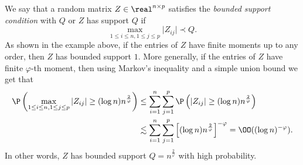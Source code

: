 \documentclass[aos,preprint]{imsart}
\begin{document}
 


We say that a random matrix $Z \in\real^{n \times p}$ satisfies the {\it{bounded support condition}} with $Q$ or $Z$ has support $Q$ if
\begin{equation}
	\max_{1\le i \le n, 1 \le j \le p}\vert Z_{i j} \vert \prec Q. \label{eq_support}
\end{equation}
As shown in the example above, if the entries of $Z$ have finite moments up to any order, then $Z$ has bounded support $1$.
More generally, if the entries of $Z$ have finite $\varphi$-th moment, then using Markov's inequality and a simple union bound we get that %
\begin{align}
	\P\left(\max_{1\le i\le n, 1\le j \le p}|Z_{i  j}|\ge (\log n) n^{\frac{2}{\varphi}}\right) &\le \sum_{i=1}^n \sum_{j=1}^p \P\left(|Z_{i j}|\ge (\log n) n^{\frac{2}{\varphi}}\right)  \nonumber\\
	&\lesssim \sum_{i=1}^n \sum_{j=1}^p  \left[(\log n) n^{\frac{2}{\varphi}}\right]^{-\varphi} = \OO((\log n)^{-\varphi}).\label{Ptrunc}
	\end{align}
In other words, $Z$ has bounded support $Q=n^{\frac{2}{\varphi}}$ with high probability.
\end{document}
